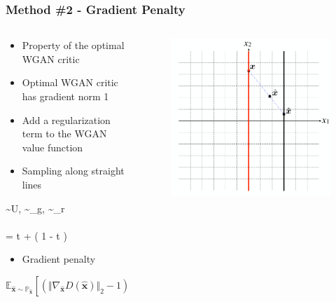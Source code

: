 \documentclass{Bredelebeamer}
\begin{document}
\begin{frame}
	\frametitle{Method \#2 - Gradient Penalty}
	\begin{columns}
	\begin{column}{0.5\textwidth}
		\begin{itemize}[<+->]
			\item Property of the optimal WGAN critic
			\item Optimal WGAN critic has gradient norm 1
			\item Add a regularization term to the WGAN value function
			\item Sampling along straight lines
		\end{itemize}
		\pause[4]
		\begin{gathered}
			\quad \quad \epsilon \sim U\big[0, 1 \big],  \sim {}_g,  \sim {}_r \\
			\\

		\quad {} = t  + \left( 1 - t \right) 

		\end{gathered}
		\pause
		\begin{itemize}
			\item Gradient penalty
		\end{itemize}
		\[
			\mathbb{E}_{\bm{\hat{x}} \sim \mathbb{P}_{\bm{\hat{x}}}} \left[ \left( \Vert \nabla_{\bm{\hat{x}}} D(\bm{\hat{x}}) \Vert_2  - 1 \right)^2  \right]
		\]
	\end{column}
	\pause[4]
	\begin{column}{0.5\textwidth}  %
		\begin{figure}[h!]
			\centering
			\includegraphics[width=\textwidth]{sampling_x.png}
		\end{figure}
	\end{column}
	\end{columns}
\end{frame}
\end{document}
